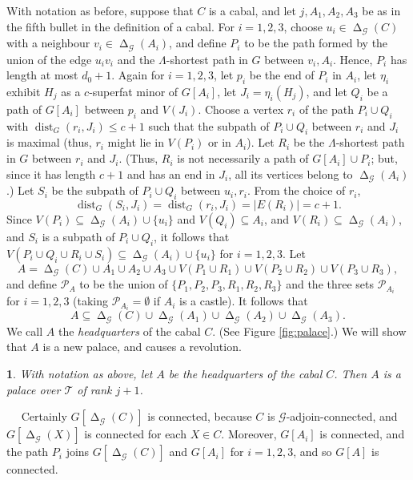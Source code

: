 \documentclass[titlepage,11pt]{article}
\newcommand{\dist}{\operatorname{dist}}
\newcommand{\voro}{\operatorname{\Delta}}
\newcommand{\mac}{\mathcal}
\newtheorem{thm}{}[section]
\newcommand{\Proof}{\noindent{\bf Proof.}\ \ }
\begin{document}
	With notation as before, suppose that $C$ is a cabal, and let
	$j, A_1,A_2,A_3$ be as in the fifth bullet in the definition of a cabal.
	For $i = 1,2,3$, choose $u_i\in \voro_{\mac G}(C)$ with a neighbour $v_i\in \voro_{\mac G}(A_i)$, and 
	define $P_i$ to be the path formed by the union of the edge $u_iv_i$ and 
	the 
	$\Lambda$-shortest path in $G$ between $v_i, A_i$. Hence, $P_i$ has length at most $d_0+1$.
	Again for $i = 1,2,3$, let $p_i$ be the end of $P_i$ in $A_i$, let $\eta_i$ exhibit $H_j$
	as a $c$-superfat minor of $G[A_i]$, let $J_i = \eta_i(H_j)$, and let $Q_i$ be a path of $G[A_i]$ between $p_i$ and $V(J_i)$. Choose a vertex $r_i$
	of the path $P_i\cup Q_i$ with $\dist_G(r_i, J_i)\le c+1$ such that the subpath of $P_i\cup Q_i$ between $r_i$ and $J_i$
	is maximal (thus, $r_i$ might lie in $V(P_i)$ or
	in $A_i$). Let $R_i$ be the $\Lambda$-shortest path in $G$ between $r_i$ and $J_i$. (Thus, $R_i$ is not necessarily a path of
	$G[A_i]\cup P_i$; but, since it has length $c+1$ and has an end in $J_i$, all its vertices belong to $\voro_{\mac G}(A_i)$.) 
	Let $S_i$ be the subpath of $P_i\cup Q_i$ between $u_i,r_i$. 
	From the choice of $r_i$,
	$$\dist_G(S_i,J_i) = \dist_G(r_i, J_i) =|E(R_i)|=c+1.$$
	Since $V(P_i)\subseteq \voro_{\mac G}(A_i)\cup \{u_i\}$ and $V(Q_i)\subseteq A_i$, and $V(R_i)\subseteq \voro_{\mac G}(A_i)$,
	and $S_i$ is a subpath of $P_i\cup Q_i$, it follows that $V(P_i\cup Q_i\cup R_i\cup S_i)\subseteq \voro_{\mac G}(A_i)\cup \{u_i\}$ for $i = 1,2,3$.
	Let 
	$$A=\voro_{\mac G}(C)\cup A_1\cup A_2\cup A_3 \cup V(P_1\cup R_1)\cup V(P_2\cup R_2)\cup V(P_3\cup R_3),$$
	and define $\mac P_A$ to be the 
	union of $\{P_1,P_2,P_3,R_1,R_2,R_3\}$ and the three sets $\mac P_{A_i}$ for $i = 1,2,3$ (taking $\mac P_{A_i}=\emptyset$
	if $A_i$ is a castle). It follows that 
	$$A\subseteq \voro_{\mac G}(C)\cup \voro_{\mac G}(A_1)\cup \voro_{\mac G}(A_2)\cup \voro_{\mac G}(A_3).$$
	We call $A$ the {\em headquarters} of the cabal $C$. (See Figure \ref{fig:palace}.)
	We will show that $A$ is a new palace, and causes 
	a revolution. 
	
	\begin{thm}\label{usecabal1}
		With notation as above, let $A$ be the headquarters of the cabal $C$.
		Then $A$ is a palace over $\mac T$ of rank $j+1$.
	\end{thm}
	\Proof 
	Certainly $G[\voro_{\mac G}(C)]$ is connected, because 
	$C$ is $\mac G$-adjoin-connected, and $G[\voro_{\mac G}(X)]$ is connected for each $X\in C$. 
	Moreover, $G[A_i]$ is connected, and the path $P_i$ joins
	$G[\voro_{\mac G}(C)]$ and $G[A_i]$ for $i = 1,2,3$, and so $G[A]$ is connected.
	
\end{document}

